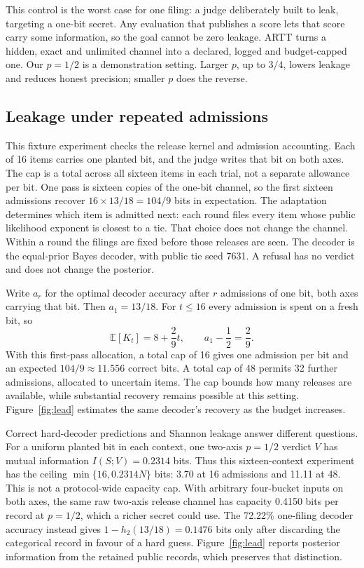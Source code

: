 \documentclass[10pt,twocolumn]{article}
\begin{document}
This control is the worst case for one filing: a judge deliberately built to leak, targeting a one-bit secret. Any evaluation that publishes a score lets that score carry some information, so the goal cannot be zero leakage. ARTT turns a hidden, exact and unlimited channel into a declared, logged and budget-capped one. Our $p=1/2$ is a demonstration setting. Larger $p$, up to $3/4$, lowers leakage and reduces honest precision; smaller $p$ does the reverse.

\subsection{Leakage under repeated admissions}
\label{sec:multibit}
This fixture experiment checks the release kernel and admission accounting. Each of 16 items carries one planted bit, and the judge writes that bit on both axes. The cap is a total across all sixteen items in each trial, not a separate allowance per bit. One pass is sixteen copies of the one-bit channel, so the first sixteen admissions recover $16\times 13/18=104/9$ bits in expectation. The adaptation determines which item is admitted next: each round files every item whose public likelihood exponent is closest to a tie. That choice does not change the channel. Within a round the filings are fixed before those releases are seen. The decoder is the equal-prior Bayes decoder, with public tie seed 7631. A refusal has no verdict and does not change the posterior.

Write $a_r$ for the optimal decoder accuracy after $r$ admissions of one bit, both axes carrying that bit. Then $a_1=13/18$. For $t\le 16$ every admission is spent on a fresh bit, so
\[
\mathbb E[K_t]=8+\frac29 t,\qquad a_1-\frac12=\frac29.
\]
With this first-pass allocation, a total cap of 16 gives one admission per bit and an expected $104/9\approx 11.556$ correct bits. A total cap of 48 permits 32 further admissions, allocated to uncertain items. The cap bounds how many releases are available, while substantial recovery remains possible at this setting. Figure~\ref{fig:lead} estimates the same decoder's recovery as the budget increases.

Correct hard-decoder predictions and Shannon leakage answer different questions. For a uniform planted bit in each context, one two-axis $p=1/2$ verdict $V$ has mutual information $I(S;V)=0.2314$ bits. Thus this sixteen-context experiment has the ceiling $\min\{16,0.2314N\}$ bits: 3.70 at 16 admissions and 11.11 at 48. This is not a protocol-wide capacity cap. With arbitrary four-bucket inputs on both axes, the same raw two-axis release channel has capacity 0.4150 bits per record at $p=1/2$, which a richer secret could use. The 72.22\% one-filing decoder accuracy instead gives $1-h_2(13/18)=0.1476$ bits only after discarding the categorical record in favour of a hard guess. Figure~\ref{fig:lead} reports posterior information from the retained public records, which preserves that distinction.
\end{document}
